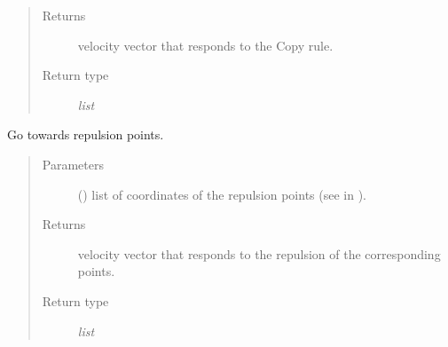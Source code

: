 \documentclass[a4paper,11pt,oneside,english]{sphinxmanual}
\begin{document}
\begin{fulllineitems}
\begin{fulllineitems}
\begin{quote}
\begin{description}
\item[{Returns}] \leavevmode
velocity vector that responds to the Copy rule.

\item[{Return type}] \leavevmode
\textit{list}

\end{description}\end{quote}

\bigskip 
\bigskip 

\end{fulllineitems}


\begin{fulllineitems}
\label{\detokenize{bird:bird.Bird.repulsion}}
Go towards repulsion points.
\begin{quote}\begin{description}
\item[{Parameters}] \leavevmode
{} () \textendash{} list of coordinates of the repulsion points (see  in {\hyperref[\detokenize{parameters:module-0}]{}}).

\item[{Returns}] \leavevmode
velocity vector that responds to the repulsion of the corresponding points.

\item[{Return type}] \leavevmode
\textit{list}

\end{description}\end{quote}

\bigskip 
\bigskip 

\end{fulllineitems}



\end{fulllineitems}
\end{document}
